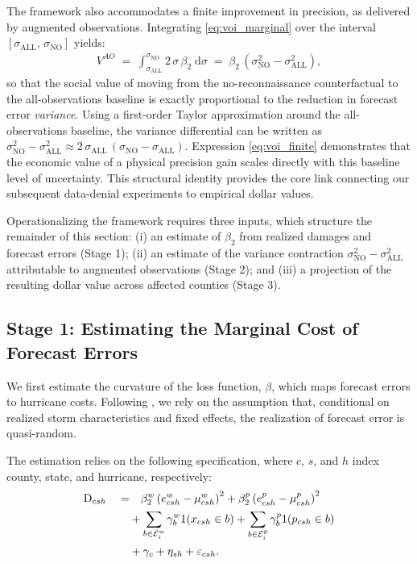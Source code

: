 \documentclass[12pt]{article}%
\begin{document}
The framework also accommodates a finite improvement in precision, as delivered by augmented observations. Integrating \eqref{eq:voi_marginal} over the interval $[\sigma_{\text{ALL}},\,\sigma_{\text{NO}}]$ yields:
\begin{align}\label{eq:voi_finite}
    V^{AO} \;=\; \int_{\sigma_{\text{ALL}}}^{\sigma_{\text{NO}}}
    2\,\sigma\,\beta_{2}\;\mathrm{d}\sigma \;=\;
    \beta_{2}\,\left(\sigma_{\text{NO}}^{2}-\sigma_{\text{ALL}}^{2}\right),
\end{align}
so that the social value of moving from the no-reconnaissance counterfactual to the all-observations baseline is exactly proportional to the reduction in forecast error \emph{variance}. Using a first-order Taylor approximation around the all-observations baseline, the variance differential can be written as $\sigma_{\text{NO}}^{2} - \sigma_{\text{ALL}}^{2} \approx 2\,\sigma_{\text{ALL}}\,(\sigma_{\text{NO}} - \sigma_{\text{ALL}})$. Expression \eqref{eq:voi_finite} demonstrates that the economic value of a physical precision gain scales directly with this baseline level of uncertainty. This structural identity provides the core link connecting our subsequent data-denial experiments to empirical dollar values.

Operationalizing the framework requires three inputs, which structure the remainder of this section: (i) an estimate of $\beta_{2}$ from realized damages and forecast errors (Stage 1); (ii) an estimate of the variance contraction $\sigma_{\text{NO}}^{2}-\sigma_{\text{ALL}}^{2}$ attributable to augmented observations (Stage 2); and (iii) a projection of the resulting dollar value across affected counties (Stage 3).

\subsection{Stage 1: Estimating the Marginal Cost of Forecast Errors}

We first estimate the curvature of the loss function, $\beta$, which maps forecast errors to hurricane costs. Following \citet{molina2024social}, we rely on the assumption that, conditional on realized storm characteristics and fixed effects, the realization of forecast error is quasi-random. 

The estimation relies on the following specification, where $c$, $s$, and $h$ index county, state, and hurricane, respectively:
\begin{align} \label{eq:stage1_reg}
    \text{D}_{csh} \quad
        =& 
        \quad \beta^w_2 \left(e^w_{csh}-\mu^w_{csh}\right)^2 + \beta^p_2 \left(e^p_{csh}-\mu^p_{csh}\right)^2 \notag\\
        &+ \sum_{b \in \mathcal{E}^w_i} \gamma^w_b 1(x_{csh} \in b) + \sum_{b \in \mathcal{E}^p_i} \gamma^p_b 1(p_{csh} \in b) \notag\\
        & + \gamma_{c} + \eta_{sh} + \varepsilon_{csh}. 
\end{align}
\end{document}
